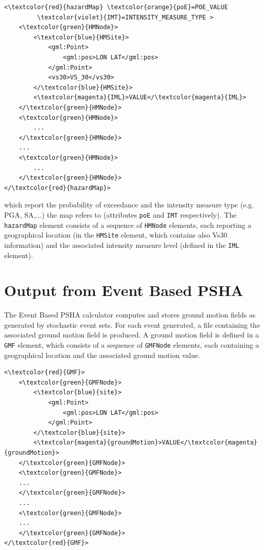 \begin{Verbatim}[frame=single, commandchars=\\\{\}, samepage=true]
<\textcolor{red}{hazardMap} \textcolor{orange}{poE}=POE_VALUE
		 \textcolor{violet}{IMT}=INTENSITY_MEASURE_TYPE >
	<\textcolor{green}{HMNode}>
		<\textcolor{blue}{HMSite}>
			<gml:Point>
				<gml:pos>LON LAT</gml:pos>
			</gml:Point>
			<vs30>VS_30</vs30>
		</\textcolor{blue}{HMSite}>
		<\textcolor{magenta}{IML}>VALUE</\textcolor{magenta}{IML}>
	</\textcolor{green}{HMNode}>
	<\textcolor{green}{HMNode}>
		...
	</\textcolor{green}{HMNode}>
	...      
	<\textcolor{green}{HMNode}>
		...
	</\textcolor{green}{HMNode}>
</\textcolor{red}{hazardMap}>
\end{Verbatim}
which report the probability of exceedance and the intensity measure type (e.g. PGA, SA,...) the map refers to (attributes \Verb+poE+ and \Verb+IMT+ respectively). The \Verb+hazardMap+ element consists of a sequence of \Verb+HMNode+ elements, each reporting a geographical location (in the \Verb+HMSite+ element, which contains also Vs30 information) and the associated intensity measure level (defined in the \Verb+IML+ element).

\section{Output from Event Based PSHA}\label{EventBasedOutput}
The Event Based PSHA calculator computes and stores ground motion fields as generated by stochastic event sets. For each event generated, a file containing the associated ground motion field is produced. A ground motion field is defined in a \Verb+GMF+ element, which consists of a sequence of \Verb+GMFNode+ elements, each containing a geographical location and the associated ground motion value.
\begin{Verbatim}[frame=single, commandchars=\\\{\}, samepage=true]
<\textcolor{red}{GMF}>
	<\textcolor{green}{GMFNode}>
		<\textcolor{blue}{site}>
			<gml:Point>
				<gml:pos>LON LAT</gml:pos>
			</gml:Point>
		</\textcolor{blue}{site}>
		<\textcolor{magenta}{groundMotion}>VALUE</\textcolor{magenta}{groundMotion}>
	</\textcolor{green}{GMFNode}>
	<\textcolor{green}{GMFNode}>
	...
	</\textcolor{green}{GMFNode}>
	...
	<\textcolor{green}{GMFNode}>
	...
	</\textcolor{green}{GMFNode}>
</\textcolor{red}{GMF}>
\end{Verbatim}

